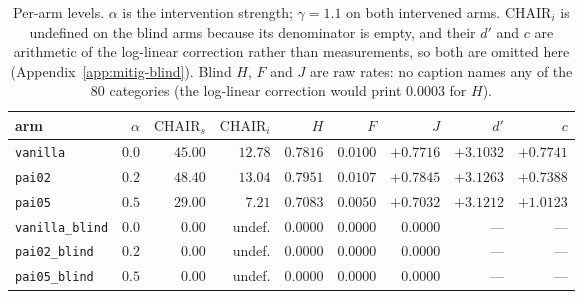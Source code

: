\begin{table}[htb]
\caption{Per-arm levels. $\alpha$ is the intervention strength; $\gamma = 1.1$ on both intervened
arms. $\mathrm{CHAIR}_i$ is undefined on the blind arms because its denominator is empty, and their
$d'$ and $c$ are arithmetic of the log-linear correction rather than measurements, so both are
omitted here (Appendix~\ref{app:mitig-blind}). Blind $H$, $F$ and $J$ are raw rates: no caption names any
of the $80$ categories (the log-linear correction would print $0.0003$ for $H$).}
\label{tab:mdlevels}
\begin{center}
\small
\setlength{\tabcolsep}{4pt}
\begin{tabular}{lrrrrrrrr}
\toprule
arm & $\alpha$ & $\mathrm{CHAIR}_s$ & $\mathrm{CHAIR}_i$ & $H$ & $F$ & $J$ & $d'$ & $c$ \\
\midrule
\texttt{vanilla} & $0.0$ & $45.00$ & $12.78$ & $0.7816$ & $0.0100$ & $+0.7716$ & $+3.1032$ & $+0.7741$ \\
\texttt{pai02} & $0.2$ & $48.40$ & $13.04$ & $0.7951$ & $0.0107$ & $+0.7845$ & $+3.1263$ & $+0.7388$ \\
\texttt{pai05} & $0.5$ & $29.00$ & $7.21$ & $0.7083$ & $0.0050$ & $+0.7032$ & $+3.1212$ & $+1.0123$ \\
\midrule
\texttt{vanilla\_blind} & $0.0$ & $0.00$ & undef. & $0.0000$ & $0.0000$ & $0.0000$ & --- & --- \\
\texttt{pai02\_blind} & $0.2$ & $0.00$ & undef. & $0.0000$ & $0.0000$ & $0.0000$ & --- & --- \\
\texttt{pai05\_blind} & $0.5$ & $0.00$ & undef. & $0.0000$ & $0.0000$ & $0.0000$ & --- & --- \\
\bottomrule
\end{tabular}
\end{center}
\end{table}

